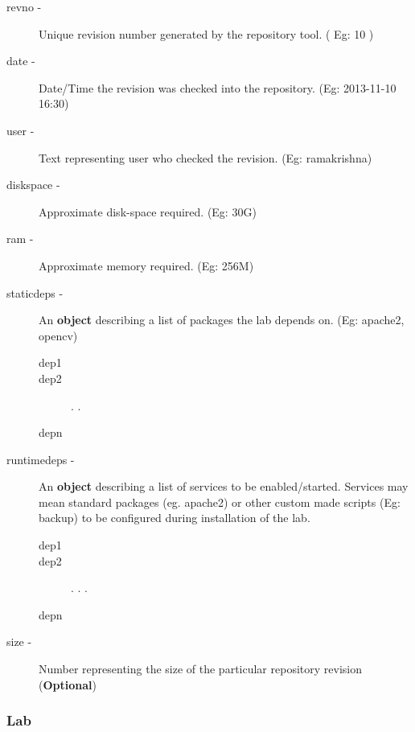\documentclass[11pt]{article}
\begin{document}
\begin{description}
\begin{description}
\begin{description}
\begin{description}
\begin{description}
\item [revno -] Unique revision number generated by the repository tool. ( Eg: 10 )
\item [date -] Date/Time the revision was checked into the repository. (Eg: 2013-11-10 16:30)
\item [user -] Text representing user who checked the revision. (Eg: ramakrishna)
\item [diskspace -] Approximate disk-space required. (Eg: 30G)
\item [ram -] Approximate memory required. (Eg: 256M)
\item [staticdeps -] An \textbf{object} describing a list of packages the lab depends on. (Eg: apache2, opencv)

\begin{description}
\item [dep1]
\item [dep2]
                      .
                      .
\item [depn]
\end{description}

\item [runtimedeps -] An \textbf{object} describing a list of services to be enabled/started. Services may mean
                                standard packages (eg. apache2) or other custom made scripts (Eg: backup)
                                to be configured during installation of the lab.

\begin{description}
\item [dep1]
\item [dep2]
                      .
                      .
                      .
\item [depn]
\end{description}

\item [size -] Number representing the size of the particular repository revision (\textbf{Optional})
\end{description}

\end{description}

\end{description}

\end{description}

\end{description}
\subsubsection{Lab}
\label{sec-1.3.2}
\end{document}
